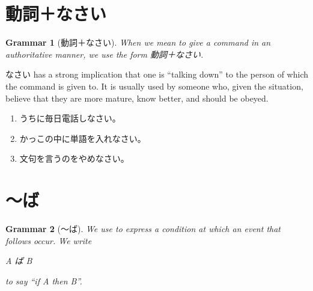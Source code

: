 \documentclass[notoc,notitlepage]{tufte-book}
\newtheorem{grammar}{\faBook Grammar}
\begin{document}

\section{動詞＋なさい}%
\label{sec:doushi_nasai}

\begin{grammar}[動詞＋なさい]\label{grammar:doushi_nasai}
  When we mean to give a command in an authoritative manner,
  we use the form 動詞＋なさい.
\end{grammar}

\begin{note}
  なさい has a strong implication that one is ``talking down''
  to the person of which the command is given to.
  It is usually used by someone who, given the situation, believe
  that they are more mature, know better, and should be obeyed.
\end{note}

\begin{eg}
  \begin{enumerate}
    \item うちに毎日電話しなさい。
    \item かっこの中に単語を入れなさい。
    \item 文句を言うのをやめなさい。
  \end{enumerate}
\end{eg}


\section{〜ば}%
\label{sec:ba}

\begin{grammar}[〜ば]\label{grammar:_ba}
  We use  to express a condition at which an event that follows
  occur. We write
  \begin{center}
    A ば B
  \end{center}
  to say ``if A then B''.
\end{grammar}
\end{document}
